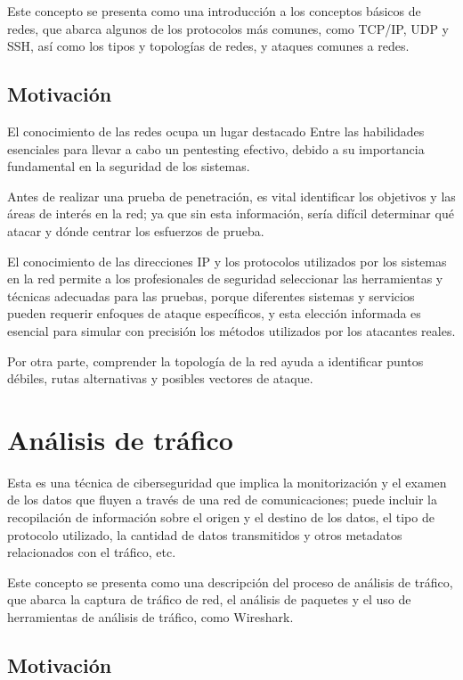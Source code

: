         Este concepto se presenta como una introducción a los conceptos básicos de redes, que abarca algunos de los protocolos más comunes, como TCP/IP, UDP y SSH, así como los tipos y topologías de redes, y ataques comunes a redes.

        \subsection{Motivación}

            El conocimiento de las redes ocupa un lugar destacado Entre las habilidades esenciales para llevar a cabo un pentesting efectivo, debido a su importancia fundamental en la seguridad de los sistemas.

            Antes de realizar una prueba de penetración, es vital identificar los objetivos y las áreas de interés en la red; ya que sin esta información, sería difícil determinar qué atacar y dónde centrar los esfuerzos de prueba.

            El conocimiento de las direcciones IP y los protocolos utilizados por los sistemas en la red permite a los profesionales de seguridad seleccionar las herramientas y técnicas adecuadas para las pruebas, porque diferentes sistemas y servicios pueden requerir enfoques de ataque específicos, y esta elección informada es esencial para simular con precisión los métodos utilizados por los atacantes reales.

            Por otra parte, comprender la topología de la red ayuda a identificar puntos débiles, rutas alternativas y posibles vectores de ataque.
        

    \section{Análisis de tráfico}

        Esta es una técnica de ciberseguridad que implica la monitorización y el examen de los datos que fluyen a través de una red de comunicaciones; puede incluir la recopilación de información sobre el origen y el destino de los datos, el tipo de protocolo utilizado, la cantidad de datos transmitidos y otros metadatos relacionados con el tráfico, etc.

        Este concepto se presenta como una descripción del proceso de análisis de tráfico, que abarca la captura de tráfico de red, el análisis de paquetes y el uso de herramientas de análisis de tráfico, como Wireshark.

        \subsection{Motivación}

